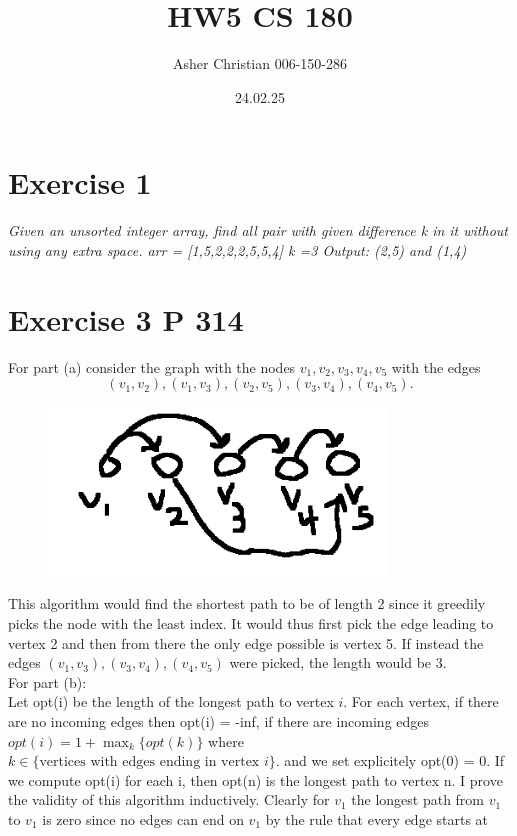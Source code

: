 \documentclass{amsart}
\title{HW5 CS 180}
\author{Asher Christian 006-150-286}
\date{ 24.02.25}
\begin{document}
\maketitle

\section{Exercise 1}
\emph{
    Given an unsorted integer array, find all pair with given difference k in it without using any
    extra space.
    arr = [1,5,2,2,2,5,5,4] k =3
    Output: (2,5) and (1,4)
}

\section{Exercise 3 P 314}
For part (a)
consider the graph with the nodes
$v_1,v_2,v_3,v_4,v_5$
with the edges
\[
    (v_1,v_2), (v_1,v_3), (v_2,v_5), (v_3,v_4), (v_4,v_5)
.\] 
\begin{figure}[H]
    \centering
    \includegraphics[width=0.8\textwidth]{example_graph.png}
\end{figure}
This algorithm would find the shortest path to be of length 2 since it greedily picks the node
with the least index. It would thus first pick the edge leading to vertex 2 and then from there the only edge possible is vertex 5.
If instead the edges $(v_1,v_3),(v_3,v_4),(v_4,v_5)$ were picked, the length would be 3.
\\
For part (b):\\
Let opt(i) be the length of the longest path to vertex $i$. For each vertex, if there are no incoming
edges then opt(i) = -inf, if there are incoming edges $opt(i) = 1 + \max_{k}\{opt(k)\}$ where $k \in \{\text{vertices with edges ending in vertex $i$}\}$. and
we set explicitely opt(0) = 0. If we compute opt(i) for each i, then opt(n) is the longest path to vertex n.
I prove the validity of this algorithm inductively.
Clearly for $v_1$ the longest path from $v_1$ to $v_1$ is zero since no edges can end on $v_1$ by the rule that every edge starts at 
\end{document}
